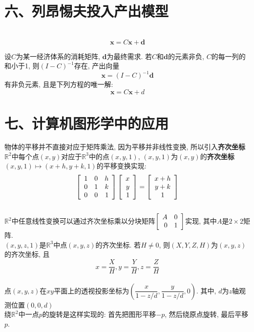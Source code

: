 \section{六、列昂惕夫投入产出模型}
\begin{law}[列昂惕夫投入产出模型或生产方程]\ \\
\[\bm{x}=C\bm{x}+\bm{d}\]
\end{law}\vspace{4ex}

\begin{theorem}
设$C$为某一经济体系的消耗矩阵, $\bm{d}$为最终需求. 若$C$和$\bm{d}$的元素非负, $C$的每一列的和小于1, 则$(I-C)^{-1}$存在, 产出向量
\[\bm{x}=(I-C)^{-1}\bm{d}\]
有非负元素, 且是下列方程的唯一解:
\[\bm{x}=C\bm{x}+d\]
\end{theorem}\vspace{8ex}

\section{七、计算机图形学中的应用}
物体的平移并不直接对应于矩阵乘法, 因为平移并非线性变换, 所以引入\textbf{齐次坐标}\\[1ex]
$\mathbb{R}^2$中每个点$(x,y)$对应于$\mathbb{R}^3$中的点$(x,y,1)$, $(x,y,1)$为$(x,y)$的\textbf{齐次坐标}\\[1ex]
$(x,y,1)\mapsto(x+h,y+k,1)$的平移变换实现:\\
\[\left[\begin{array}{r r r}
1 & 0 & h\\
0 & 1 & k\\
0 & 0 & 1
\end{array}\right]
\left[\begin{array}{r}
x\\
y\\
1
\end{array}\right]=
\left[\begin{array}{c}
x+h\\
y+k\\
1
\end{array}\right]\]\\[2ex]
$\mathbb{R}^2$中任意线性变换可以通过齐次坐标乘以分块矩阵$\left[\begin{array}{r r}A & 0\\0 & 1\end{array}\right]$实现, 其中$A$是$2\times 2$矩阵.\\[2ex]
$(x,y,z,1)$是$\mathbb{R}^3$中点$(x,y,z)$的齐次坐标. 若$H\neq 0$, 则$(X,Y,Z,H)$为$(x,y,z)$的齐次坐标, 且
\[x=\frac{X}{H},y=\frac{Y}{H},z=\frac{Z}{H}\]\\[1ex]
点$(x,y,z)$在$xy$平面上的透视投影坐标为$(\dfrac{x}{1-z/d}, \dfrac{y}{1-z/d}, 0)$. 其中, $d$为$z$轴观测位置$(0,0,d)$\\[2ex]
绕$\mathbb{R}^2$中一点$p$的旋转是这样实现的: 首先把图形平移$-p$, 然后绕原点旋转, 最后平移$p$.
